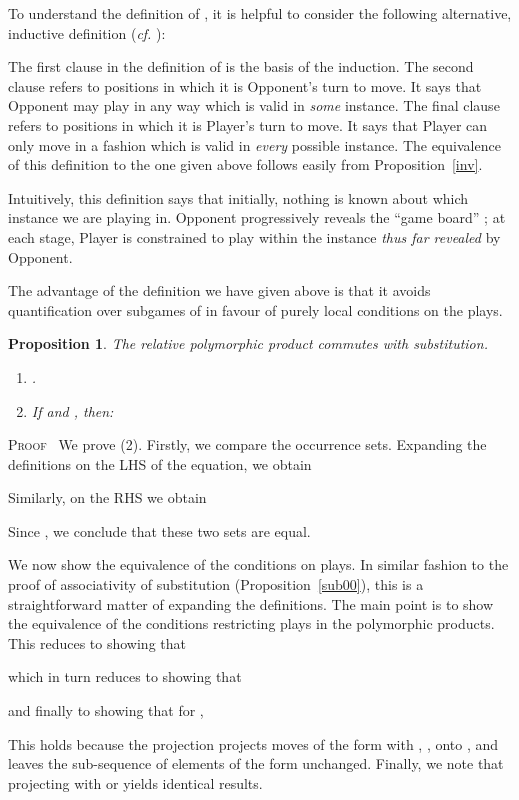 \documentclass[a4paper,11pt]{article}
\newtheorem{proposition}{Proposition}[section]
\newenvironment{proof}{\textsc{Proof}\ }{}
\begin{document}
To understand the definition of , it is helpful to
consider the following alternative, inductive definition (\textit{cf.}
\cite{Abr96}):

The first clause in the definition of 
is the basis of the induction.
The second clause refers to positions in which it is Opponent's turn to move.
It says that Opponent may play in any way which is valid in {\em some}
instance. The final clause refers
to positions in which it is Player's turn to move.
It says that Player can only move in a fashion which is valid in {\em every}
possible instance. The equivalence of this definition to the one given
above follows easily from Proposition~\ref{inv}.

Intuitively, this definition says that initially, nothing is known about which instance we are playing in.
Opponent progressively reveals the ``game board'' ;
at each stage, Player is constrained to play within the instance
{\em thus far revealed} by Opponent.

The advantage of the definition we have given above is that it avoids
quantification over subgames of  in favour of purely local
conditions on the plays.

\begin{proposition}
\label{sub2}
The relative polymorphic product commutes with substitution.
\begin{enumerate}
\item .
\item If  and ,  then:

\end{enumerate}
\end{proposition}
\begin{proof}
We prove (2). Firstly, we compare the occurrence sets.
Expanding the definitions on the LHS of the equation, we obtain

Similarly, on the RHS we obtain

Since , we conclude that these two sets are equal.

We now show the equivalence of the conditions on plays. In similar fashion to the proof of associativity of substitution (Proposition~\ref{sub00}), this is a straightforward matter of expanding the definitions. The main point is to show the equivalence of the conditions restricting plays in the polymorphic products. This reduces to showing that

which in turn reduces to showing that

and finally to showing that for ,

This holds because the projection  projects moves of the form   with ,  , onto , and leaves the sub-sequence of elements of the form  unchanged.
Finally, we note that projecting  with  or  yields identical results.
\end{proof}
\end{document}
